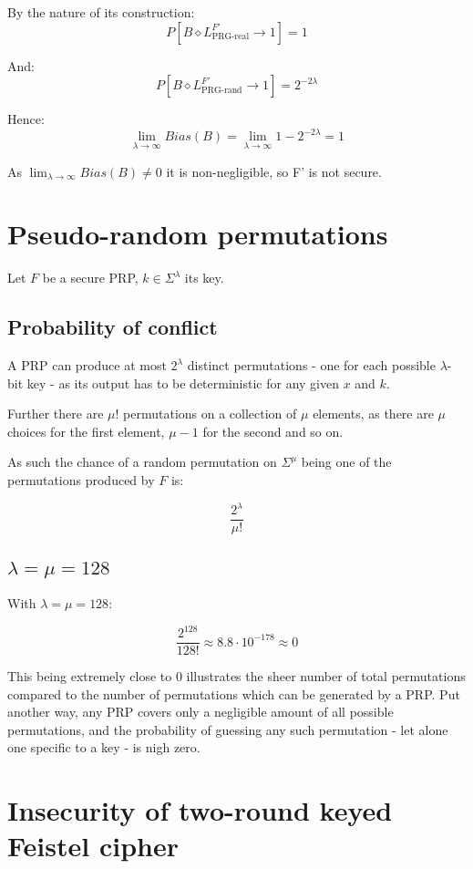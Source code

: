 \documentclass[a4paper]{scrreprt}
\begin{document}
By the nature of its construction:
\[
	P[B \diamond L^{F'}_{\text{PRG-real}} \rightarrow 1] = 1
\]

And:
\[
	P[B \diamond L^{F'}_{\text{PRG-rand}} \rightarrow 1] = 2^{-2\lambda}
\]

Hence:
\[
	\lim_{\lambda \to \infty} Bias(B) = \lim_{\lambda \to \infty} 1 - 2^{-2\lambda} = 1
\]

As $\lim_{\lambda \to \infty} Bias(B) \neq 0$ it is non-negligible, so F' is
not secure.

\section{Pseudo-random permutations}

Let $F$ be a secure PRP, $k \in \Sigma^\lambda$ its key.

\subsection{Probability of conflict}


A PRP can produce at most $2^\lambda$ distinct permutations - one for each
possible $\lambda$-bit key - as its output has to be deterministic for any
given $x$ and $k$.

Further there are $\mu!$ permutations on a collection of $\mu$ elements, as
there are $\mu$ choices for the first element, $\mu - 1$ for the second and so
on.

As such the chance of a random permutation on $\Sigma^\mu$ being one of the
permutations produced by $F$ is:

\[
	\frac{2^\lambda}{\mu!}
\]

\subsection{$\lambda = \mu = 128$}

With $\lambda = \mu = 128$:

\[
	\frac{2^{128}}{128!} \approx 8.8 \cdot 10^{-178} \approx 0
\]

This being extremely close to $0$ illustrates the sheer number of total
permutations compared to the number of permutations which can be generated by a
PRP. Put another way, any PRP covers only a negligible amount of all possible
permutations, and the probability of guessing any such permutation - let alone
one specific to a key - is nigh zero.

\section{Insecurity of two-round keyed Feistel cipher}
\end{document}
